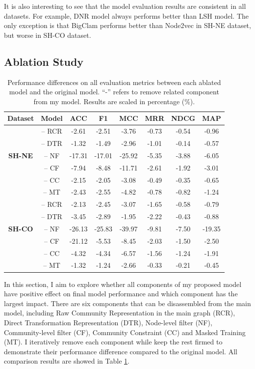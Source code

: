 It is also interesting to see that the model evaluation results are consistent in all datasets. For example, DNR model always performs better than LSH model. The only exception is that BigClam performs better than Node2vec in SH-NE dataset, but worse in SH-CO dataset. 


\subsection{Ablation Study}
\begin{table}[h]
	
	\centering
	\begin{tabular}{|c|c|c|c|c|c|c|c|} 
		\hline
		\textbf{Dataset}& \textbf{Model}	
		& \textbf{ACC}& \textbf{F1}& \textbf{MCC}& \textbf{MRR} & \textbf{NDCG}& \textbf{MAP}\\ \hline
		\multirow{5}{*}{ \textbf{SH-NE}} & -- RCR  &-2.61&-2.51&-3.76&-0.73&-0.54&-0.96\\
		& -- DTR &-1.32&-1.49&-2.96&-1.01&-0.14&-0.57\\ 
		& -- NF &-17.31&-17.01	&-25.92&-5.35&-3.88&-6.05\\
		& -- CF &-7.94&-8.48&-11.71&-2.61&-1.92&-3.01\\
		& -- CC &-2.15&-2.05&-3.08&-0.49&-0.35&-0.65\\ 
		& -- MT &-2.43&-2.55&-4.82&-0.78&-0.82&-1.24\\ 
		\hline
		\multirow{5}{*}{ \textbf{SH-CO}} & -- RCR &-2.13&-2.45&-3.07&-1.65&-0.58&-0.79  \\  
		& -- DTR &-3.45&-2.89&-1.95&-2.22&-0.43&-0.88\\ 
		& -- NF &-26.13&-25.83&-39.97&-9.81&-7.50&-19.35\\ 
		& -- CF &-21.12&-5.53&-8.45&-2.03&-1.50&-2.50\\
		& -- CC &-4.32&-4.34&-6.57&-1.56&-1.24&-1.91\\
		& -- MT &-1.32&-1.24&-2.66&-0.33&-0.21&-0.45\\ \hline
	\end{tabular}
	\caption{Performance differences on all evaluation metrics between each ablated model and the original model. ``-'' refers to remove related component from my model. Results are scaled in percentage (\%).}
	\label{tab:c4_ablation}
\end{table} 
In this section, I aim to explore whether all components of my proposed model have positive effect on final model performance and which component has the largest impact. There are six components that can be disassembled from the main model, including Raw Community Representation in the main graph (RCR), Direct Transformation Representation (DTR), Node-level filter (NF), Community-level filter (CF), Community Constraint (CC) and Masked Training (MT). I iteratively remove each component while keep the rest firmed to demonstrate their performance difference compared to the original model. All comparison results are showed in Table \ref{tab:c4_ablation}.


